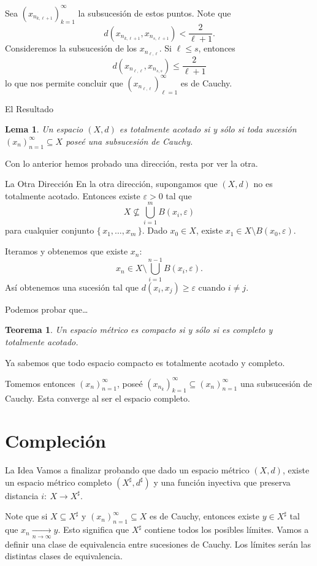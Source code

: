 \documentclass[utf8]{beamer}
\theoremstyle{plain}
\newtheorem{Th}{Teorema}               %
\newtheorem{Lem}{Lema}                 %
\theoremstyle{definition}
\theoremstyle{remark}
\numberwithin{equation}{section}
\newcommand{\eps}{\varepsilon}          %
\newcommand{\set}[1]{\{\,#1\,\}}    %
\renewcommand{\geq}{\geqslant}          %
\renewcommand{\l}{\ell}                   %
\renewcommand{\leq}{\leqslant}          %
\newcommand{\less}{\setminus}           %
\newcommand{\sucn}{_{n=1}^\infty} %
\newcommand{\suck}{_{k=1}^\infty} %
\begin{document}
\begin{frame}
  Sea $(x_{n_{k,\l+1}})\suck$ la subsucesión de estos puntos. Note que 
  $$d(x_{n_{k,\l+1}},x_{n_{s,\l+1}})<\frac{2}{\l+1}.$$
  Consideremos la subsucesión de los $x_{n_{\l,\l}}$. Si $\l\leq s$, entonces 
  $$d(x_{n_{\l,\l}},x_{n_{s,s}})\leq \frac{2}{\l+1}$$
  lo que nos permite concluir que $(x_{n_{\l,\l}})_{\l=1}^\infty$ es de Cauchy.
\end{frame}

\begin{frame}{El Resultado}
  \begin{Lem}
  Un espacio $(X,d)$ es totalmente acotado si y sólo si toda sucesión $(x_n)\sucn\subseteq X$ poseé una subsucesión de Cauchy.
  \end{Lem}
  Con lo anterior hemos probado una dirección, resta por ver la otra.
\end{frame}

\begin{frame}{La Otra Dirección}
  En la otra dirección, supongamos que $(X,d)$ no es totalmente acotado. Entonces existe $\eps>0$ tal que
    $$X\not\subseteq \bigcup_{i=1}^m B(x_i,\eps)$$
    para cualquier conjunto $\set{x_1,\dots,x_m}$. Dado $x_0\in X$, existe $x_1\in X\less B(x_0,\eps)$.\par 
  Iteramos y obtenemos que existe $x_n$:
    $$x_n\in X\less \bigcup_{i=1}^{n-1}B(x_i,\eps).$$
    Así obtenemos una sucesión tal que $d(x_i,x_j)\geq \eps$ cuando $i\neq j$. 
\end{frame}

\begin{frame}{Podemos probar que\dots}
  \begin{Th}
    Un espacio métrico es compacto si y sólo si es completo y totalmente acotado.
  \end{Th}
  Ya sabemos que todo espacio compacto es totalmente acotado y completo.\par 
  Tomemos entonces $(x_n)\sucn$, poseé $(x_{n_k})\suck\subseteq(x_n)\sucn$ una subsucesión de Cauchy. Esta converge al ser el espacio completo. 
\end{frame}

\section{Compleción}

\begin{frame}{La Idea}
  Vamos a finalizar probando que dado un espacio métrico $(X,d)$, existe un espacio métrico completo $(X^\sharp,d^\sharp)$ y una función inyectiva que preserva distancia $i:\ X\to X^\sharp$.\par 
  Note que si $X\subseteq X^\sharp$ y $(x_n)\sucn\subseteq X$ es de Cauchy, entonces existe $y\in X^\sharp$ tal que $x_n\xrightarrow[n\to\infty]{}y$. Esto significa que $X^\sharp$ contiene todos los posibles límites. Vamos a definir una clase de equivalencia entre sucesiones de Cauchy. Los límites serán las distintas clases de equivalencia.
\end{frame}
\end{document}
